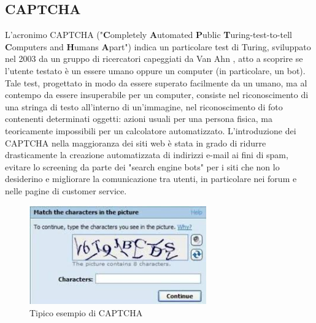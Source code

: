 \subsection{CAPTCHA}
L'acronimo CAPTCHA ("\textbf{C}ompletely \textbf{A}utomated \textbf{P}ublic \textbf{T}uring-test-to-tell \textbf{C}omputers and \textbf{H}umans \textbf{A}part") indica un particolare test di Turing, sviluppato nel 2003 da un gruppo di ricercatori capeggiati da Van Ahn \cite{von2003captcha}, atto a scoprire se l'utente testato è un essere umano oppure un computer (in particolare, un bot). Tale test, progettato in modo da essere superato facilmente da un umano, ma al contempo da essere insuperabile per un computer, consiste nel riconoscimento di una stringa di testo all'interno di un'immagine, nel riconoscimento di foto contenenti determinati oggetti: azioni usuali per una persona fisica, ma teoricamente impossibili per un calcolatore automatizzato. 
L'introduzione dei CAPTCHA nella  maggioranza dei siti web è stata in grado di ridurre drasticamente la creazione automatizzata di indirizzi e-mail ai fini di spam, evitare lo screening da parte dei "search engine bots" per i siti che non lo desiderino e migliorare la comunicazione tra utenti, in particolare nei forum e nelle pagine di customer service.
\begin{figure}[H]
	\centering
	\includegraphics[width=0.68\textwidth]{chapter3/immagini/captcha}
	\caption{Tipico esempio di CAPTCHA}
	\label{captcha}
\end{figure}
